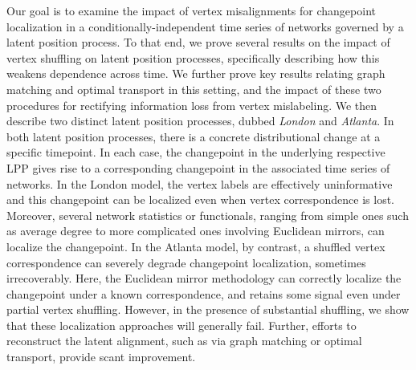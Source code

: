 \documentclass[12pt]{article}
\theoremstyle{definition}
\begin{document}
Our goal is to examine the impact of vertex misalignments for changepoint localization in a conditionally-independent time series of networks governed by a latent position process.
To that end, we prove several results on the impact of vertex shuffling on latent position processes, specifically describing how this weakens dependence across time. We further prove key results relating graph matching and optimal transport in this setting, and the impact of these two procedures for rectifying information loss from vertex mislabeling. We then  describe two distinct latent position processes, dubbed {\em London} and {\em Atlanta}. In both latent position processes, there is a concrete distributional change at a specific timepoint.
In each case, the changepoint in the underlying respective LPP gives rise to a corresponding  changepoint in the associated time series of networks. 
In the London model, the vertex labels are effectively uninformative and this changepoint can be localized even when vertex correspondence is lost. 
Moreover, several network statistics or functionals, ranging from simple ones such as average degree to more complicated ones involving Euclidean mirrors, can localize the changepoint. In the Atlanta model, by contrast, a shuffled vertex correspondence can severely degrade changepoint localization, sometimes irrecoverably.
Here, the Euclidean mirror methodology can correctly localize the changepoint under a known correspondence, and retains some signal even under partial vertex shuffling. 
However, in the presence of substantial shuffling, we show that these localization approaches will generally fail. 
Further, efforts to reconstruct the latent alignment, such as via graph matching or optimal transport, provide scant improvement.  
\end{document}
